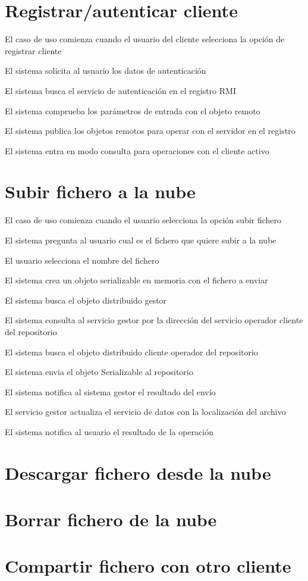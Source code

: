 \section{Registrar/autenticar cliente}

\begin{compactenum}
	\item El caso de uso comienza cuando el usuario del cliente selecciona la opción de registrar cliente
	\item El sistema solicita al usuario los datos de autenticación
	\item El sistema busca el servicio de autenticación en el registro RMI
	\item El sistema comprueba los parámetros de entrada con el objeto remoto
	\item El sistema publica los objetos remotos para operar con el servidor en el registro
	\item El sistema entra en modo consulta para operaciones con el cliente activo
\end{compactenum}

\section{Subir fichero a la nube}
\begin{compactenum}
	\item El caso de uso comienza cuando el usuario selecciona la opción subir fichero
	\item El sistema pregunta al usuario cual es el fichero que quiere subir a la nube
	\item El usuario selecciona el nombre del fichero
	\item El sistema crea un objeto serializable en memoria con el fichero a enviar
	\item El sistema busca el objeto distribuido gestor
	\item El sistema consulta al servicio gestor por la dirección del servicio operador cliente del repositorio
	\item El sistema busca el objeto distribuido cliente operador del repositorio
	\item El sistema envia el objeto Serializable al repositorio
	\item El sistema notifica al sistema gestor el resultado del envío
	\item El servicio gestor actualiza el servicio de datos con la localización del archivo
	\item El sistema notifica al usuario el resultado de la operación
\end{compactenum}

\section{Descargar fichero desde la nube}

\section{Borrar fichero de la nube}

\section{Compartir fichero con otro cliente}
